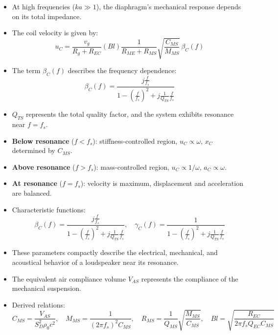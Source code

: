 \begin{tcolorbox}[colback=gray!10!white,colframe=black,title=\textbf{Summary – High-Frequency Behaviour}]
\begin{itemize}
    \item At high frequencies (\( ka \gg 1 \)), the diaphragm’s mechanical response depends on its total impedance.
    \item The coil velocity is given by:
    \[
    u_C = \frac{v_g}{R_g + R_{EC}} (B l) \frac{1}{R_{ME} + R_{MS}} \sqrt{\frac{C_{MS}}{M_{MS}}} \, \beta_C(f)
    \]
    \item The term \( \beta_C(f) \) describes the frequency dependence:
    \[
    \beta_C(f) = \frac{j \frac{f}{f_s}}{1 - \left( \frac{f}{f_s} \right)^2 + j \frac{1}{Q_{TS}} \frac{f}{f_s}}
    \]
    \item \( Q_{TS} \) represents the total quality factor, and the system exhibits resonance near \( f = f_s \).
\end{itemize}
\end{tcolorbox}



\begin{tcolorbox}[colback=gray!10!white,colframe=black,title=\textbf{Summary – Behaviour Around Resonance}]
\begin{itemize}
    \item \textbf{Below resonance} (\( f < f_s \)): stiffness-controlled region, \( u_C \propto \omega \), \( x_C \) determined by \( C_{MS} \).
    \item \textbf{Above resonance} (\( f > f_s \)): mass-controlled region, \( u_C \propto 1/\omega \), \( a_C \propto \omega \).
    \item \textbf{At resonance} (\( f = f_s \)): velocity is maximum, displacement and acceleration are balanced.
    \item Characteristic functions:
    \[
    \beta_C(f) = \frac{j \frac{f}{f_s}}{1 - \left( \frac{f}{f_s} \right)^2 + j \frac{1}{Q_{TS}} \frac{f}{f_s}}, \quad
    \gamma_C(f) = \frac{1}{1 - \left( \frac{f}{f_s} \right)^2 + j \frac{1}{Q_{TS}} \frac{f}{f_s}}
    \]
\end{itemize}
\end{tcolorbox}



\begin{tcolorbox}[colback=gray!10!white,colframe=black,title=\textbf{Summary – Thiele–Small Parameters}]
\begin{itemize}
    \item These parameters compactly describe the electrical, mechanical, and acoustical behavior of a loudspeaker near its resonance.
    \item The equivalent air compliance volume \( V_{AS} \) represents the compliance of the mechanical suspension.
    \item Derived relations:
    \[
    C_{MS} = \frac{V_{AS}}{S_D^2 \rho_0 c^2}, \quad
    M_{MS} = \frac{1}{(2\pi f_s)^2 C_{MS}}, \quad
    R_{MS} = \frac{1}{Q_{MS}} \sqrt{\frac{M_{MS}}{C_{MS}}}, \quad
    B l = \sqrt{\frac{R_{EC}}{2\pi f_s Q_{EC} C_{MS}}}
    \]
\end{itemize}
\end{tcolorbox}


